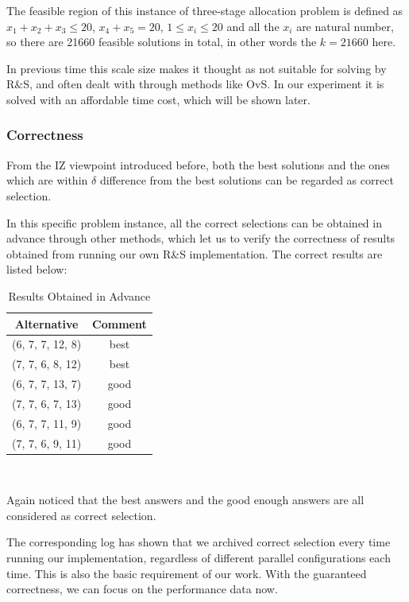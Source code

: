 The feasible region of this instance of three-stage allocation problem is defined as $x_1 + x_2 + x_3 \leqslant 20$, $x_4 + x_5 = 20$, $1 \leqslant x_i \leqslant 20$ and all the $x_i$ are natural number, so there are 21660 feasible solutions in total, in other words the $k = 21660$ here.

In previous time this scale size makes it thought as not suitable for solving by R\&S, and often dealt with through methods like OvS. In our experiment it is solved with an affordable time cost, which will be shown later.

\subsubsection{Correctness}

From the IZ viewpoint introduced before, both the best solutions and the ones which are within $\delta$ difference from the best solutions can be regarded as correct selection.

In this specific problem instance, all the correct selections can be obtained in advance through other methods, which let us to verify the correctness of results obtained from running our own R\&S implementation. The correct results are listed below:

\begin{table}[ht]
\begin{center}
\begin{tabular}{|c|c|}
\hline
Alternative & Comment \\
\hline
(6, 7, 7, 12, 8) & best \\
(7, 7, 6, 8, 12) & best \\
(6, 7, 7, 13, 7) & good \\
(7, 7, 6, 7, 13) & good \\
(6, 7, 7, 11, 9) & good \\
(7, 7, 6, 9, 11) & good \\
\hline
\end{tabular} \\
\caption{Results Obtained in Advance}
\end{center}
\end{table}

Again noticed that the best answers and the good enough answers are all considered as correct selection.

The corresponding log has shown that we archived correct selection every time running our implementation, regardless of different parallel configurations each time. This is also the basic requirement of our work. With the guaranteed correctness, we can focus on the performance data now.

